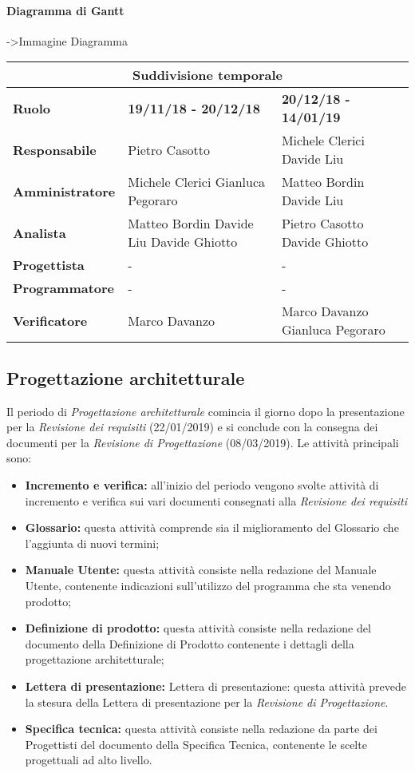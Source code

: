 	\paragraph{Diagramma di Gantt}
	->Immagine Diagramma
	

	\begin{tabular}{|l|l|l|}
		\hline
		\multicolumn{3}{|c|}{\textbf{Suddivisione temporale}}\\
		\hline
		\textbf{Ruolo} & \textbf{19/11/18 - 20/12/18} & \textbf{20/12/18 - 14/01/19} \\
		\hline
		\textbf{Responsabile} & Pietro Casotto  & Michele Clerici Davide Liu  \\
		\hline
		\textbf{Amministratore} & Michele Clerici Gianluca Pegoraro & Matteo Bordin Davide Liu \\
		\hline
		\textbf{Analista} & Matteo Bordin Davide Liu Davide Ghiotto & Pietro Casotto Davide Ghiotto \\
		\hline
		\textbf{Progettista} & - & - \\
		\hline
		\textbf{Programmatore} & - & - \\
		\hline
		\textbf{Verificatore} & Marco Davanzo & Marco Davanzo Gianluca Pegoraro \\
		\hline
	\end{tabular}
	
	\subsection{Progettazione architetturale}
	Il periodo di \textit{Progettazione architetturale} comincia il giorno dopo la presentazione per la \textit{Revisione dei requisiti} (22/01/2019) e si conclude con la consegna dei documenti per la \textit{Revisione di Progettazione} (08/03/2019). Le attività principali sono:
	\begin{itemize}
		\item{\textbf{Incremento e verifica:} all'inizio del periodo vengono svolte attività di incremento e verifica sui vari documenti consegnati alla \textit{Revisione dei requisiti}}
		\item{\textbf{Glossario:} questa attività comprende sia il miglioramento del Glossario che l’aggiunta di nuovi termini;}
		\item{\textbf{Manuale Utente:}  questa attività consiste nella redazione del Manuale Utente, contenente indicazioni sull’utilizzo del programma che sta venendo prodotto;}
		\item{\textbf{Definizione di prodotto:} questa attività consiste nella redazione del documento della Definizione di Prodotto contenente i dettagli della progettazione architetturale;}
		\item{\textbf{Lettera di presentazione:} Lettera di presentazione: questa attività prevede la stesura della Lettera di presentazione per la \textit{Revisione di Progettazione}.}
		\item{\textbf{Specifica tecnica:} questa attività consiste nella redazione da parte dei Progettisti del documento della Specifica Tecnica, contenente le scelte progettuali ad alto livello.}
	\end{itemize}

